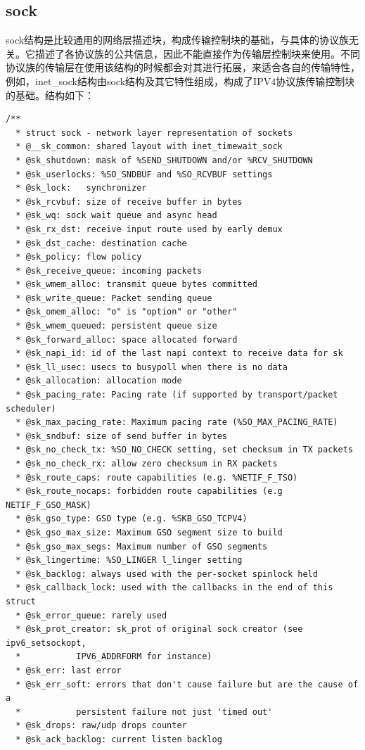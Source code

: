 \documentclass[11pt, a4paper,oneside]{book}
\theoremstyle{ocrenumbox}
\theoremstyle{purplenumbox}
\theoremstyle{blackbox}
\begin{document}
		\subsection{sock}
			sock结构是比较通用的网络层描述块，构成传输控制块的基础，与具体的协议族无关。它描述了各协议族的公共信息，因此不能直接作为传输层控制块来使用。不同协议族的传输层在使用该结构的时候都会对其进行拓展，来适合各自的传输特性，例如，inet\_sock结构由sock结构及其它特性组成，构成了IPV4协议族传输控制块的基础。结构如下：
\begin{verbatim}
/**
  *	struct sock - network layer representation of sockets
  *	@__sk_common: shared layout with inet_timewait_sock
  *	@sk_shutdown: mask of %SEND_SHUTDOWN and/or %RCV_SHUTDOWN
  *	@sk_userlocks: %SO_SNDBUF and %SO_RCVBUF settings
  *	@sk_lock:	synchronizer
  *	@sk_rcvbuf: size of receive buffer in bytes
  *	@sk_wq: sock wait queue and async head
  *	@sk_rx_dst: receive input route used by early demux
  *	@sk_dst_cache: destination cache
  *	@sk_policy: flow policy
  *	@sk_receive_queue: incoming packets
  *	@sk_wmem_alloc: transmit queue bytes committed
  *	@sk_write_queue: Packet sending queue
  *	@sk_omem_alloc: "o" is "option" or "other"
  *	@sk_wmem_queued: persistent queue size
  *	@sk_forward_alloc: space allocated forward
  *	@sk_napi_id: id of the last napi context to receive data for sk
  *	@sk_ll_usec: usecs to busypoll when there is no data
  *	@sk_allocation: allocation mode
  *	@sk_pacing_rate: Pacing rate (if supported by transport/packet scheduler)
  *	@sk_max_pacing_rate: Maximum pacing rate (%SO_MAX_PACING_RATE)
  *	@sk_sndbuf: size of send buffer in bytes
  *	@sk_no_check_tx: %SO_NO_CHECK setting, set checksum in TX packets
  *	@sk_no_check_rx: allow zero checksum in RX packets
  *	@sk_route_caps: route capabilities (e.g. %NETIF_F_TSO)
  *	@sk_route_nocaps: forbidden route capabilities (e.g NETIF_F_GSO_MASK)
  *	@sk_gso_type: GSO type (e.g. %SKB_GSO_TCPV4)
  *	@sk_gso_max_size: Maximum GSO segment size to build
  *	@sk_gso_max_segs: Maximum number of GSO segments
  *	@sk_lingertime: %SO_LINGER l_linger setting
  *	@sk_backlog: always used with the per-socket spinlock held
  *	@sk_callback_lock: used with the callbacks in the end of this struct
  *	@sk_error_queue: rarely used
  *	@sk_prot_creator: sk_prot of original sock creator (see ipv6_setsockopt,
  *			  IPV6_ADDRFORM for instance)
  *	@sk_err: last error
  *	@sk_err_soft: errors that don't cause failure but are the cause of a
  *		      persistent failure not just 'timed out'
  *	@sk_drops: raw/udp drops counter
  *	@sk_ack_backlog: current listen backlog

\end{verbatim}
\end{document}
